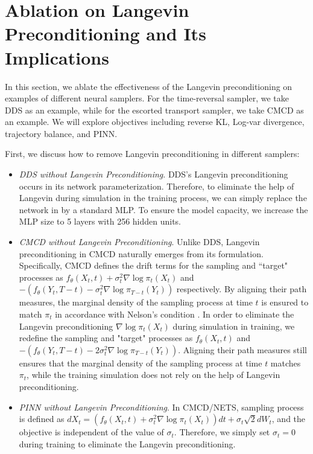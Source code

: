 
\section{Ablation on Langevin Preconditioning and Its Implications}



In this section, we ablate the effectiveness of the Langevin preconditioning on examples of different neural samplers.  
For the time-reversal sampler, we take DDS as an example, while for the escorted transport sampler, we take CMCD as an example.
We will explore objectives including reverse KL, Log-var divergence, trajectory balance, and PINN.

First, we discuss {how to remove Langevin preconditioning in different samplers}:
\begin{itemize}[leftmargin=*]
    \item \emph{DDS without Langevin Preconditioning}. DDS's Langevin preconditioning occurs in its network parameterization. 
Therefore, to eliminate the help of Langevin during simulation in the training process, we can simply replace the network in  by a standard MLP. 
To ensure the model capacity, we increase the MLP size to 5 layers with 256 hidden units.
\item \emph{CMCD without Langevin Preconditioning}. Unlike DDS, Langevin preconditioning in CMCD naturally emerges from its formulation.
Specifically, CMCD defines the drift terms for the sampling and ``target" processes as $
    f_\theta(X_t, t) +\sigma_t^2  \nabla \log \pi_t (X_t)$ and $-(f_\theta(Y_{t}, T-t) - \sigma_t^2 \nabla \log \pi_{T-t} (Y_{t}))$ respectively. By aligning their path measures, the marginal density of the sampling process at time 
$t$ is ensured to match 
$\pi_t$ in accordance with Nelson's condition \citep{nelson}.
In order to eliminate the Langevin preconditioning $\nabla \log \pi_t (X_t)$ during simulation in training, we redefine the sampling and "target" processes as $
    f_\theta(X_t, t)$ and $-(f_\theta(Y_{t}, T-t) - 2\sigma_t^2  \nabla \log \pi_{T-t} (Y_{t}))$.
Aligning their path measures still ensures that the marginal density of the sampling process at time
$t$ matches
$\pi_t$, while the training simulation does not rely on the help of Langevin preconditioning.
\item \emph{PINN without Langevin Preconditioning}. In CMCD/NETS, sampling process is defined as $
  dX_t =   \left(f_\theta(X_t, t) +\sigma_t^2  \nabla \log \pi_t (X_t)\right) dt + \sigma_t\sqrt{2} dW_t$, and the objective is independent of the value of $\sigma_t$.
Therefore, we simply set $\sigma_t = 0$ during training to eliminate the Langevin preconditioning. 
\end{itemize}
